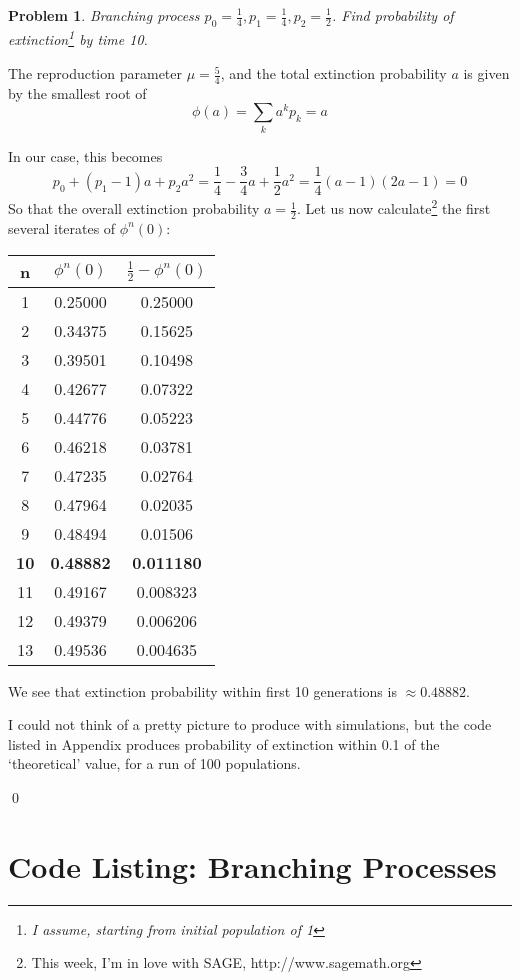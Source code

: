 \documentclass[8pt,notitlepage,letter]{report}
\newtheorem{problem}{Problem}
\newenvironment{solution}[1][Solution]{\begin{trivlist}
    \item[\hskip \labelsep {\bfseries #1}]}{\end{trivlist}}
\newcommand{\PP}{\mathbb{P}}
\begin{document}
\begin{problem}
Branching process $p_0=\frac{1}{4}, p_1=\frac{1}{4}, p_2=\frac{1}{2}$. 
Find probability of extinction\footnote{
	I assume, starting from initial population of 1} by time 10.
\end{problem}
\begin{solution}


The reproduction parameter $\mu=\frac{5}{4}$, and 
the total extinction probability $a$ is given by the smallest root of
\begin{equation}
\phi(a) = \sum_k a^k p_k = a
\end{equation}

In our case, this becomes
\begin{equation}
p_0 + (p_1 - 1) a + p_2 a^2 
	= \frac{1}{4} - \frac{3}{4} a + \frac{1}{2} a^2
	= \frac{1}{4}(a-1)(2a-1)
	= 0
\end{equation}
So that the overall extinction probability $a=\frac{1}{2}$. 
Let us now calculate\footnote{
	This week, I'm in love with {\rm SAGE}, http://www.sagemath.org} 
the first several iterates of $\phi^n(0)$:

\begin{tabular}{ccc}
n & $\phi^n(0)$ & $\frac{1}{2} -\phi^n(0)$ \\
\hline
1 & 0.25000 & 0.25000 			\\
2 & 0.34375 & 0.15625			\\
3 & 0.39501 &0.10498		\\
4 & 0.42677 & 0.07322		\\
5 & 0.44776 & 0.05223		\\
6 & 0.46218 & 0.03781		\\
7 & 0.47235 & 0.02764		\\
8 & 0.47964 & 0.02035		\\
9 & 0.48494 & 0.01506		\\
{\bf 10}& {\bf 0.48882}&  {\bf 0.011180}	\\
11 & 0.49167 & 0.008323	\\
12 & 0.49379 & 0.006206	\\
13 & 0.49536 & 0.004635	\\
\end{tabular}

We see that extinction probability within first 10 generations is 
$\approx 0.48882$.

I could not think of a pretty picture to produce with simulations, 
but the code listed in Appendix produces probability of extinction 
within 0.1 of the `theoretical' value, for a run of 100 populations.




\qed
\end{solution}
\newpage
\appendix
\section*{Code Listing: Branching Processes}

\end{document}
